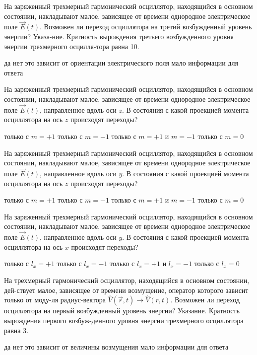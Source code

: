 \documentclass[11pt,a4paper]{exam}
\begin{document}
\begin{questions}
\question На заряженный трехмерный гармонический осциллятор, находящийся в основном состоянии, накладывают малое, зависящее от времени однородное электрическое поле $\vec E(t)$. Возможен ли переход осциллятора на третий возбужденный уровень энергии? Указа-ние. Кратность вырождения третьего возбужденного уровня энергии трехмерного осцилля-тора равна 10.
\begin{choices}
\choice да
\choice нет
\choice это зависит от ориентации электрического поля
\choice мало информации для ответа
\end{choices}

\question На заряженный трехмерный гармонический осциллятор, находящийся в основном состоянии, накладывают малое, зависящее от времени однородное электрическое поле $\vec E(t)$, направленное вдоль оси $z$. В состояния с какой проекцией момента осциллятора на ось $z$ происходят переходы?
\begin{choices}
\choice только с $m =  + 1$        
\choice только с $m =  - 1$
\choice только с $m =  + 1$ и $m =  - 1$ 
\choice только с $m = 0$
\end{choices}

\question На заряженный трехмерный гармонический осциллятор, находящийся в основном состоянии, накладывают малое, зависящее от времени однородное электрическое поле $\vec E(t)$, направленное вдоль оси $y$. В состояния с какой проекцией момента осциллятора на ось $z$ происходят переходы?
\begin{choices}
\choice только с $m =  + 1$        
\choice только с $m =  - 1$
\choice только с $m =  + 1$ и $m =  - 1$ 
\choice только с $m = 0$
\end{choices}

\question На заряженный трехмерный гармонический осциллятор, находящийся в основном состоянии, накладывают малое, зависящее от времени однородное электрическое поле $\vec E(t)$, направленное вдоль оси $y$. В состояния с какой проекцией момента осциллятора на ось $x$ происходят переходы?
\begin{choices}
\choice только с ${l_x} =  + 1$          
\choice только с ${l_x} =  - 1$
\choice только с ${l_x} =  + 1$ и ${l_x} =  - 1$  
\choice только с ${l_x} = 0$
\end{choices}

\question На трехмерный гармонический осциллятор, находящийся в основном состоянии, дей-ствует малое, зависящее от времени возмущение, оператор которого зависит только от моду-ля радиус-вектора $\hat V(\vec r,t) \to \hat V(r,t)$. Возможен ли переход осциллятора на первый возбужденный уровень энергии? Указание. Кратность вырождения первого возбуж-денного уровня энергии трехмерного осциллятора равна 3.
\begin{choices}
\choice да
\choice нет
\choice это зависит от величины возмущения
\choice мало информации для ответа
\end{choices}


\end{questions}
\end{document}
